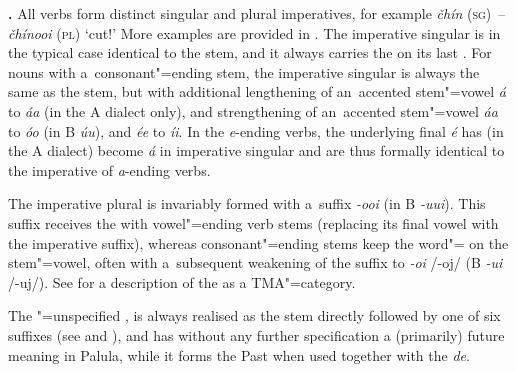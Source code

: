 \textbf{.} All verbs form distinct singular and plural imperatives, for example \textit{čhín} \textsc{(sg)}~-- \textit{čhínooi} (\textsc{pl}) `cut!' More examples are provided in . The imperative singular is in the typical case identical to the  stem, and it always carries the  on its last . For nouns with a~consonant"=ending stem, the imperative singular is always the same as the stem, but with additional lengthening of an~accented stem"=vowel \textit{á} to \textit{áa} (in the A dialect only), and strengthening of an~accented stem"=vowel \textit{áa} to \textit{óo} (in B \textit{úu}), and \textit{ée} to \textit{íi}. In the \textit{e}-ending verbs, the underlying final \textit{é} has (in the A dialect) become \textit{á} in imperative singular and are thus formally identical to the imperative of \textit{a}-ending verbs.

The imperative plural is invariably formed with a~suffix \textit{-ooi} (in B \textit{-uui}). This suffix receives the  with vowel"=ending verb stems (replacing its final vowel with the imperative suffix), whereas consonant"=ending stems keep the word"= on the stem"=vowel, often with a~subsequent weakening of the suffix to \textit{-oi} /-oj/ (B \textit{-ui} /-uj/). See  for a description of the  as a TMA"=category.


 The "=unspecified , is always realised as the
 stem directly followed by one of six  suffixes (see
 and ), and has without any further specification a (primarily) future meaning in Palula, while it forms the Past  when used together with the  \textit{de}.


